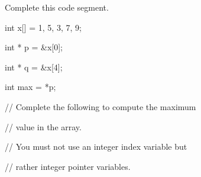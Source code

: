 Complete this code segment.



\begin{consolethree}[escapeinside=||]

int x[] = {1, 5, 3, 7, 9};

int * p = &x[0];

int * q = &x[4];



int max = *p;



// Complete the following to compute the maximum

// value in the array.

// You must not use an integer index variable but

// rather integer pointer variables.

\end{consolethree}

